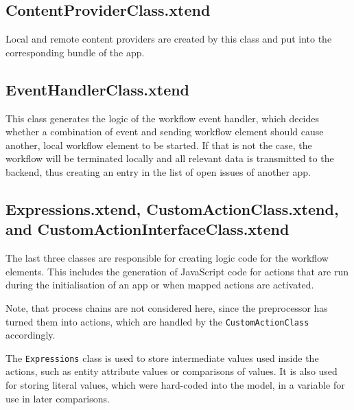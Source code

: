 \subsection{ContentProviderClass.xtend}
Local and remote content providers are created by this class and put into the corresponding bundle of the app.

\subsection{EventHandlerClass.xtend}
This class generates the logic of the workflow event handler, which decides whether a combination of event and sending workflow element should cause another, local workflow element to be started. If that is not the case, the workflow will be terminated locally and all relevant data is transmitted to the backend, thus creating an entry in the list of open issues of another app.

\subsection{Expressions.xtend, CustomActionClass.xtend, and CustomActionInterfaceClass.xtend}

The last three classes are responsible for creating logic code for the workflow elements. This includes the generation of JavaScript code for actions that are run during the initialisation of an app or when mapped actions are activated. 

Note, that process chains are not considered here, since the preprocessor has turned them into actions, which are handled by the \lstinline|CustomActionClass| accordingly.

The \lstinline|Expressions| class is used to store intermediate values used inside the actions, such as entity attribute values or comparisons of values. It is also used for storing literal values, which were hard-coded into the model, in a variable for use in later comparisons.
